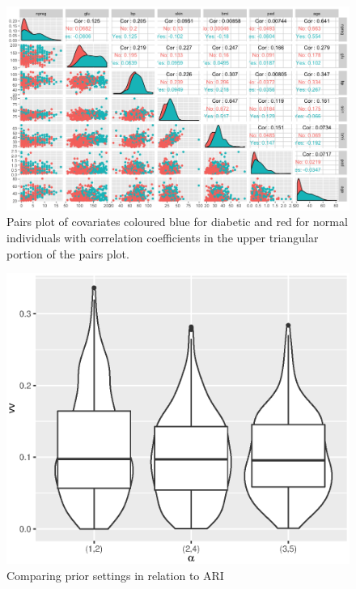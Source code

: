 \documentclass[12pt, centerh1]{article}
\begin{document}
\begin{figure}[!htb]
\label{pairsPlot}
\caption{Pairs plot of covariates coloured blue for diabetic and red for normal individuals with correlation coefficients in the upper triangular portion of the pairs plot.}
\includegraphics[scale=0.50]{plotgg}
\end{figure}


\begin{figure}[!htb]
\label{Priorcomp}
\centering
\caption{Comparing prior settings in relation to ARI}
\includegraphics[scale=0.50]{priors.eps}
\end{figure}
\end{document}
